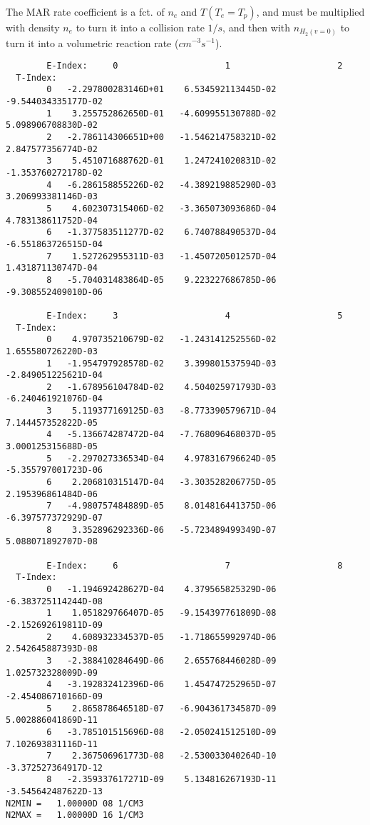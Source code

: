 \documentclass[12pt,dvipdfmx]{article}
\begin{document}
{The MAR rate coefficient is a fct. of $n_e$ and $T (T_e=T_p)$, and must be multiplied with density $n_e$ to turn it into a collision rate $1/s$,
and then with $n_{H_2(v=0)}$ to turn it into a volumetric reaction rate ($cm^{-3}s^{-1}$).


\begin{small}\begin{verbatim}
        E-Index:     0                     1                     2
  T-Index:
        0   -2.297800283146D+01    6.534592113445D-02   -9.544034335177D-02
        1    3.255752862650D-01   -4.609955130788D-02    5.098906708830D-02
        2   -2.786114306651D+00   -1.546214758321D-02    2.847577356774D-02
        3    5.451071688762D-01    1.247241020831D-02   -1.353760272178D-02
        4   -6.286158855226D-02   -4.389219885290D-03    3.206993381146D-03
        5    4.602307315406D-02   -3.365073093686D-04    4.783138611752D-04
        6   -1.377583511277D-02    6.740788490537D-04   -6.551863726515D-04
        7    1.527262955311D-03   -1.450720501257D-04    1.431871130747D-04
        8   -5.704031483864D-05    9.223227686785D-06   -9.308552409010D-06

        E-Index:     3                     4                     5
  T-Index:
        0    4.970735210679D-02   -1.243141252556D-02    1.655580726220D-03
        1   -1.954797928578D-02    3.399801537594D-03   -2.849051225621D-04
        2   -1.678956104784D-02    4.504025971793D-03   -6.240461921076D-04
        3    5.119377169125D-03   -8.773390579671D-04    7.144457352822D-05
        4   -5.136674287472D-04   -7.768096468037D-05    3.000125315688D-05
        5   -2.297027336534D-04    4.978316796624D-05   -5.355797001723D-06
        6    2.206810315147D-04   -3.303528206775D-05    2.195396861484D-06
        7   -4.980757484889D-05    8.014816441375D-06   -6.397577372929D-07
        8    3.352896292336D-06   -5.723489499349D-07    5.088071892707D-08

        E-Index:     6                     7                     8
  T-Index:
        0   -1.194692428627D-04    4.379565825329D-06   -6.383725114244D-08
        1    1.051829766407D-05   -9.154397761809D-08   -2.152692619811D-09
        2    4.608932334537D-05   -1.718655992974D-06    2.542645887393D-08
        3   -2.388410284649D-06    2.655768446028D-09    1.025732328009D-09
        4   -3.192832412396D-06    1.454747252965D-07   -2.454086710166D-09
        5    2.865878646518D-07   -6.904361734587D-09    5.002886041869D-11
        6   -3.785101515696D-08   -2.050241512510D-09    7.102693831116D-11
        7    2.367506961773D-08   -2.530033040264D-10   -3.372527364917D-12
        8   -2.359337617271D-09    5.134816267193D-11   -3.545642487622D-13
N2MIN =   1.00000D 08 1/CM3
N2MAX =   1.00000D 16 1/CM3


\end{verbatim}
\end{small}}
\end{document}
